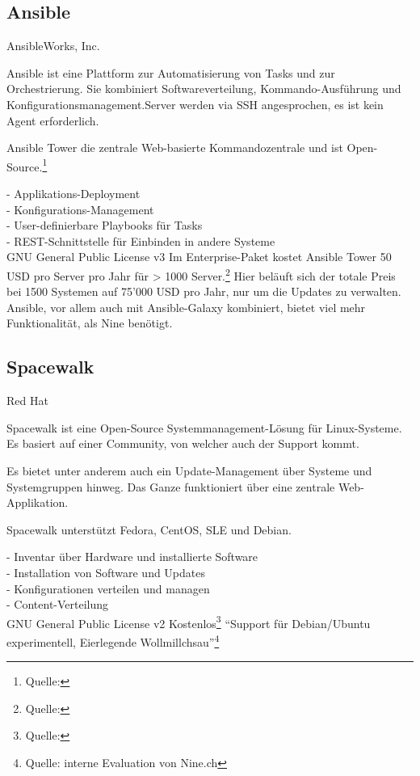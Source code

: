 \subsection{Ansible}

{AnsibleWorks, Inc.}
{Ansible ist eine Plattform zur Automatisierung von Tasks und zur Orchestrierung. Sie kombiniert Softwareverteilung, Kommando-Ausführung und Konfigurationsmanagement.Server werden via SSH angesprochen, es ist kein Agent erforderlich.

Ansible Tower die zentrale Web-basierte Kommandozentrale und ist Open-Source.\footnote{Quelle: }}
{
- Applikations-Deployment\\
- Konfigurations-Management\\
- User-definierbare Playbooks für Tasks\\
- REST-Schnittstelle für Einbinden in andere Systeme\\
}
{GNU General Public License v3}
{Im Enterprise-Paket kostet Ansible Tower 50 USD pro Server pro Jahr für > 1000 Server.\footnote{Quelle: }}
{}
{Hier beläuft sich der totale Preis bei 1500 Systemen auf 75'000 USD pro Jahr, nur um die Updates zu verwalten. Ansible, vor allem auch mit Ansible-Galaxy kombiniert, bietet viel mehr Funktionalität, als Nine benötigt.}

\subsection{Spacewalk}

{Red Hat}
{Spacewalk ist eine Open-Source Systemmanagement-Lösung für Linux-Systeme. Es basiert auf einer Community, von welcher auch der Support kommt.

Es bietet unter anderem auch ein Update-Management über Systeme und Systemgruppen hinweg. Das Ganze funktioniert über eine zentrale Web-Applikation.

Spacewalk unterstützt Fedora, CentOS, SLE und Debian.}
{
- Inventar über Hardware und installierte Software\\
- Installation von Software und Updates\\
- Konfigurationen verteilen und managen\\
- Content-Verteilung\\
}
{GNU General Public License v2}
{Kostenlos\footnote{Quelle: }}
{}
{``Support für Debian/Ubuntu experimentell, Eierlegende Wollmillchsau''\footnote{Quelle: interne Evaluation von Nine.ch}}

